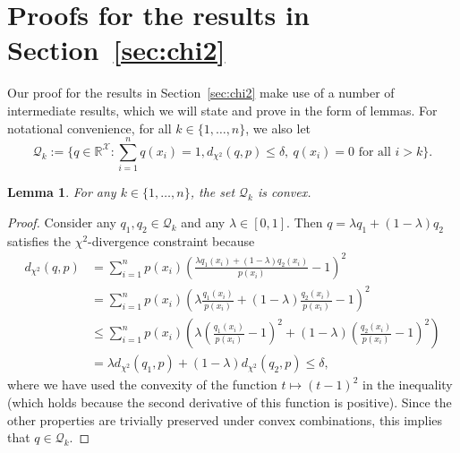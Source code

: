 \documentclass{article}
\newtheorem{lemma}{Lemma}
\begin{document}
\section{Proofs for the results in Section~\ref{sec:chi2}}

Our proof for the results in Section~\ref{sec:chi2} make use of a number of intermediate results, which we will state and prove in the form of lemmas. For notational convenience, for all $k\in\{1,\ldots,n\}$, we also let
\begin{equation*}
\mathcal{Q}_k:=\{q\in\mathbb{R}^{\mathcal{X}}
\colon
\sum_{i=1}^n q(x_i)=1, d_{\chi^2}(q,p)\leq\delta,~q(x_i)=0\text{ for all }i>k\}.
\end{equation*}

\begin{lemma}\label{lemma:convexitychi2}
For any $k\in\{1,\ldots,n\}$, the set $\mathcal{Q}_k$ is convex.
\end{lemma}
\begin{proof}
Consider any $q_1,q_2\in\mathcal{Q}_k$ and any $\lambda\in[0,1]$. Then $q=\lambda q_1+(1-\lambda)q_2$ satisfies the $\chi^2$-divergence constraint because
\begin{align*}
d_{\chi^2}(q,p)
&=\sum_{i=1}^n p(x_i)\left(\frac{\lambda q_1(x_i)+(1-\lambda)q_2(x_i)}{p(x_i)}-1\right)^2\\
&=\sum_{i=1}^n p(x_i)\left(\lambda\frac{q_1(x_i)}{p(x_i)}+(1-\lambda)\frac{q_2(x_i)}{p(x_i)}-1\right)^2\\
&\leq\sum_{i=1}^n p(x_i)\left(\lambda\left(\frac{q_1(x_i)}{p(x_i)}-1\right)^2+(1-\lambda)\left(\frac{q_2(x_i)}{p(x_i)}-1\right)^2\right)\\
&=\lambda d_{\chi^2}(q_1,p)+(1-\lambda)d_{\chi^2}(q_2,p)\leq\delta,
\end{align*}
where we have used the convexity of the function $t\mapsto (t-1)^2$ in the inequality (which holds because the second derivative of this function is positive). Since the other properties are trivially preserved under convex combinations, this implies that $q\in\mathcal{Q}_k$.
\end{proof}
\end{document}
